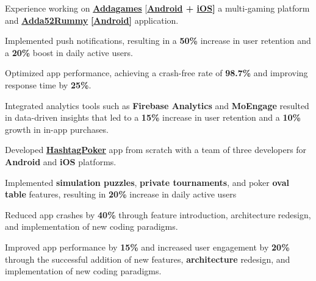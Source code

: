 \documentclass[]{deedy-resume-openfont}
\begin{document}
\begin{minipage}[t]{0.66\textwidth}
\vspace{\topsep} %
\begin{tightemize}
\item Experience working on \href{https://www.adda.games}{\bf Addagames} [{\bf  \href{https://www.adda.games}{\bf Android} + \href{https://apps.apple.com/in/app/addagames/id1565328482}{\bf iOS}]} a multi-gaming platform and \href{https://play.google.com/store/apps/details?id=com.addagames.rummy}{\bf Adda52Rummy}  \href{https://play.google.com/store/apps/details?id=com.addagames.rummy}{\bf [Android]}  application.
\item Implemented push notifications, resulting in a {\bf 50\%} increase in user retention and a {\bf 20\%} boost in daily active users.
\item Optimized app performance, achieving a crash-free rate of {\bf 98.7\%} and improving response time by {\bf 25\%}.
\item Integrated analytics tools such as {\bf Firebase Analytics} and {\bf MoEngage} resulted in data-driven insights that led to a {\bf 15\%} increase in user retention and a {\bf 10\%} growth in in-app purchases.
\end{tightemize}
\sectionsep
\sectionsep


\begin{tightemize}
\item Developed \href{https://play.google.com/store/apps/details?id=com.hashtag.poker.app}{\bf HashtagPoker} app from scratch with a team of three developers for {\bf Android} and {\bf iOS} platforms.
\item Implemented {\bf simulation puzzles}, {\bf private tournaments}, and poker {\bf oval table} features, resulting in {\bf 20\%} increase in daily active users
\item Reduced app crashes by {\bf 40\%} through feature introduction, architecture redesign, and implementation of new coding paradigms.
\item Improved app performance by {\bf 15\%} and increased user engagement by {\bf 20\%} through the successful addition of new features, {\bf architecture} redesign, and implementation of new coding paradigms.

\end{tightemize}
\sectionsep


\end{minipage}
\end{document}
